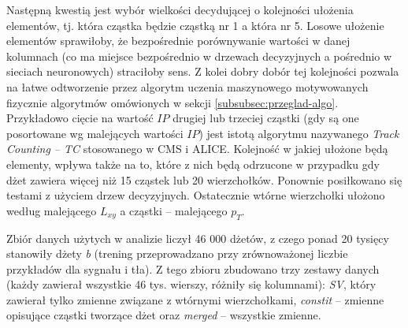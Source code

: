 Następną kwestią jest wybór wielkości decydującej o kolejności ułożenia elementów, tj. która cząstka będzie cząstką nr 1 a która nr 5. Losowe ułożenie elementów sprawiłoby, że bezpośrednie porównywanie wartości w danej kolumnach (co ma miejsce bezpośrednio w drzewach decyzyjnych a pośrednio w sieciach neuronowych) straciłoby sens. Z kolei dobry dobór tej kolejności pozwala na łatwe odtworzenie przez algorytm uczenia maszynowego motywowanych fizycznie algorytmów omówionych w sekcji \ref{subsubsec:przeglad-algo}. Przykładowo cięcie na wartość $IP$ drugiej lub trzeciej cząstki (gdy są one posortowane wg malejących wartości $IP$) jest istotą algorytmu nazywanego \textit{Track Counting -- TC} stosowanego w CMS i ALICE.
Kolejność w jakiej ułożone będą elementy, wpływa także na to, które z nich będą odrzucone w przypadku gdy dżet zawiera więcej niż 15 cząstek lub 20 wierzchołków. 
Ponownie posiłkowano się testami z użyciem drzew decyzyjnych. Ostatecznie wtórne wierzchołki ułożono według malejącego $L_{xy}$ a cząstki -- malejącego $p_T$.

Zbiór danych użytych w analizie liczył 46 000 dżetów, z czego ponad 20 tysięcy stanowiły dżety \textit{b} (trening przeprowadzano przy zrównoważonej liczbie przykładów dla sygnału i tła).
Z tego zbioru zbudowano trzy zestawy danych (każdy zawierał wszystkie 46 tys. wierszy, różniły się kolumnami): \textit{SV}, który zawierał tylko zmienne związane z wtórnymi wierzchołkami, \textit{constit} -- zmienne opisujące cząstki tworzące dżet  oraz \textit{merged} -- wszystkie zmienne.
